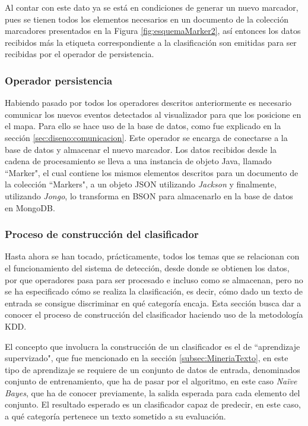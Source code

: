 Al contar con este dato ya se está en condiciones de generar un nuevo marcador, pues se tienen todos los elementos necesarios en un documento de la colección marcadores presentados en la Figura \ref{fig:esquemaMarker2}, así entonces los datos recibidos más la etiqueta correspondiente a la clasificación son emitidas para ser recibidas por el operador de persistencia.

\subsubsection*{Operador persistencia}
\label{subsubsec:8op}

Habiendo pasado por todos los operadores descritos anteriormente es necesario comunicar los nuevos eventos detectados al visualizador para que los posicione en el mapa. Para ello se hace uso de la base de datos, como fue explicado en la sección \ref{sec:diseno:comunicacion}.
Este operador se encarga de conectarse a la base de datos y almacenar el nuevo marcador. Los datos recibidos desde la cadena de procesamiento se lleva a una instancia de objeto Java, llamado ``Marker", el cual contiene los mismos elementos descritos para un documento de la colección ``Markers", a un objeto JSON utilizando \textit{Jackson} y finalmente, utilizando \textit{Jongo}, lo transforma en BSON para almacenarlo en la base de datos en MongoDB.

\subsubsection*{Proceso de construcción del clasificador}
\label{subsubsec:clasificacion}

Hasta ahora se han tocado, prácticamente, todos los temas que se relacionan con el funcionamiento del sistema de detección, desde donde se obtienen los datos, por que operadores pasa para ser procesado e incluso como se almacenan, pero no se ha especificado cómo se realiza la clasificación, es decir, cómo dado un texto de entrada se consigue discriminar en qué categoría encaja. Esta sección busca dar a conocer el proceso de construcción del clasificador haciendo uso de la metodología KDD.
	
El concepto que involucra la construcción de un clasificador es el de ``aprendizaje supervizado", que fue mencionado en la sección \ref{subsec:MineriaTexto}, en este tipo de aprendizaje se requiere de un conjunto de datos de entrada, denominados conjunto de entrenamiento, que ha de pasar por el algoritmo, en este caso \textit{Naïve Bayes}, que ha de conocer previamente, la salida esperada para cada elemento del conjunto. El resultado esperado es un clasificador capaz de predecir, en este caso, a qué categoría pertenece un texto sometido a su evaluación.

